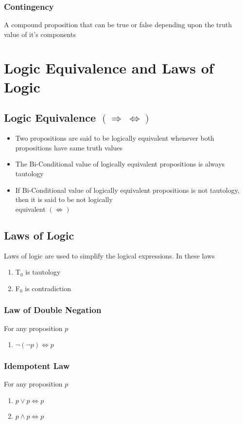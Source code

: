 \documentclass{article}
\begin{document}
	\subsubsection{Contingency}
	A compound proposition that can be true or false depending upon the truth value of it's components

	\section{Logic Equivalence and Laws of Logic}
	\subsection{Logic Equivalence $(\Rightarrow ~ \Leftrightarrow)$}
	\begin{itemize}
		\item Two propositions are said to be logically equivalent whenever both propositions have same
			truth values
		\item The Bi-Conditional value of logically equivalent propositions is always tautology
		\item If Bi-Conditional value of logically equivalent propositions is not tautology, then it is
			said to be not logically \\ equivalent $(\not\Leftrightarrow)$
	\end{itemize}

	\subsection{Laws of Logic}
	Laws of logic are used to simplify the logical expressions. In these laws
	\begin{enumerate}[label=\roman*) ]
		\item T$_0$ is tautology
		\item F$_0$ is contradiction
	\end{enumerate}

	\subsubsection{Law of Double Negation}
	For any proposition $p$
	\begin{enumerate}[label=\roman*) ]
		\item $\neg(\neg p)\Leftrightarrow p$
	\end{enumerate}

	\subsubsection{Idempotent Law}
	For any proposition $p$
	\begin{enumerate}[label=\roman*) ]
		\item $p\lor p\Leftrightarrow p$
		\item $p\land p\Leftrightarrow p$
	\end{enumerate}
\end{document}
